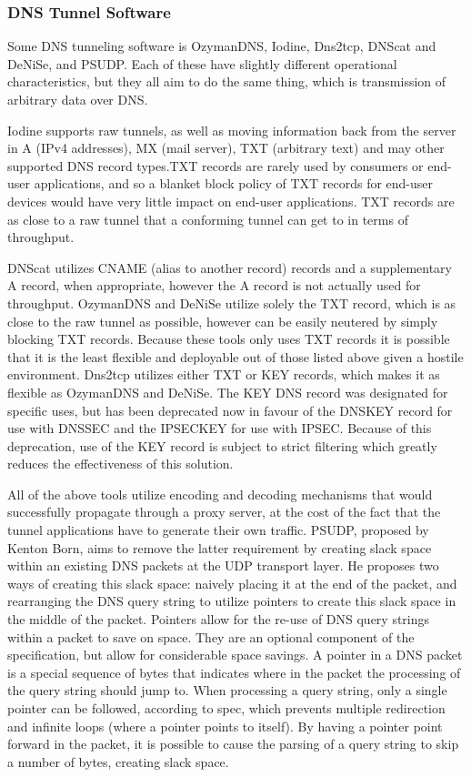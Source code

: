 \documentclass[12pt]{report}
\theoremstyle{remark}
\theoremstyle{definition}
\theoremstyle{definition}
\theoremstyle{definition}
\begin{document}
\subsubsection{DNS Tunnel Software}

Some DNS tunneling software is OzymanDNS\cite{ozymandnssrc},
Iodine\cite{iodinesrc},
Dns2tcp\cite{dns2tcpsrc},
DNScat\cite{dnscatsrc} and
DeNiSe\cite{denisesrc}, and
PSUDP\cite{psudpsrc}. Each of these have
slightly different operational characteristics, but they all aim to do the same
thing, which is transmission of arbitrary data over DNS.

Iodine supports raw tunnels, as well as moving information back from the server
in A (IPv4 addresses), MX (mail server), TXT (arbitrary text) and may other
supported DNS record types.TXT records are rarely used by
consumers or end-user applications, and so a blanket block policy of TXT
records for end-user devices would have very little impact on end-user
applications. TXT records are as close to a raw tunnel that a conforming
tunnel can get to in terms of throughput.

DNScat utilizes CNAME (alias to
another record) records and a supplementary A record, when appropriate, however
the A record is not actually used for throughput. OzymanDNS and DeNiSe utilize
solely the
TXT record, which is as close to the raw tunnel as possible, however can be
easily neutered by simply blocking TXT records. Because these tools only uses
TXT records it is possible that it is the least flexible and deployable out of
those listed above given a hostile environment. Dns2tcp utilizes either TXT or
KEY records, which makes it as flexible as OzymanDNS and DeNiSe. The KEY DNS
record was designated for specific uses\cite{rfc2931}, but has been
deprecated now\cite{rfc3445} in favour of the DNSKEY record for use with
DNSSEC\cite{rfc3755} and the IPSECKEY for use with
IPSEC\cite{rfc4025}. Because of this deprecation, use of the KEY record is
subject to strict filtering which greatly reduces the effectiveness of this
solution.

All of the above tools utilize encoding and decoding mechanisms that would
successfully propagate through a proxy server, at the cost of the fact
that the tunnel applications have to generate their own traffic. PSUDP,
proposed by Kenton Born, aims to remove the latter requirement by creating slack space
within an existing DNS packets at the UDP transport layer. He proposes two ways
of creating this slack space: naively placing it at the end of the packet, and
rearranging the DNS query string to utilize pointers to create this
slack space in the middle of the packet. Pointers allow
for the re-use of DNS query strings within a packet to save on space. They are
an optional component of the specification, but allow for considerable space
savings. A pointer in a DNS packet is a special sequence of bytes that
indicates where in the packet the processing of the query string should jump
to. When processing a query string, only a single pointer can be followed,
according to spec, which prevents multiple redirection and infinite loops
(where a pointer points to itself). By having a pointer point forward in the
packet, it is possible to cause the parsing of a query string to skip a number
of bytes, creating slack space.
\end{document}
